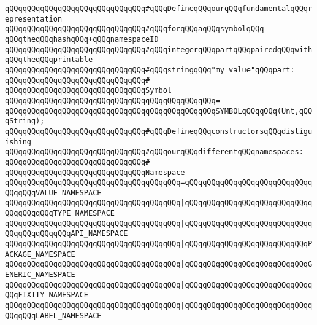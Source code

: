 \newline
\newline
\verb|qQQqqQQqqQQqqQQqqQQqqQQqqQQqqQQq#qQQqDefineqQQqourqQQqfundamentalqQQqrepresentation|\newline
\verb|qQQqqQQqqQQqqQQqqQQqqQQqqQQqqQQq#qQQqforqQQqaqQQqsymbolqQQq--qQQqtheqQQqhashqQQq+qQQqnamespaceID|\newline
\verb|qQQqqQQqqQQqqQQqqQQqqQQqqQQqqQQq#qQQqintegerqQQqpartqQQqpairedqQQqwithqQQqtheqQQqprintable|\newline
\verb|qQQqqQQqqQQqqQQqqQQqqQQqqQQqqQQq#qQQqstringqQQq"my_value"qQQqpart:|\newline
\verb|qQQqqQQqqQQqqQQqqQQqqQQqqQQqqQQq#|\newline
\verb|qQQqqQQqqQQqqQQqqQQqqQQqqQQqqQQqSymbol|\newline
\verb|qQQqqQQqqQQqqQQqqQQqqQQqqQQqqQQqqQQqqQQqqQQqqQQq=|\newline
\verb|qQQqqQQqqQQqqQQqqQQqqQQqqQQqqQQqqQQqqQQqqQQqqQQqSYMBOLqQQqqQQq(Unt,qQQqString);|\newline
\newline
\newline
\newline
\verb|qQQqqQQqqQQqqQQqqQQqqQQqqQQqqQQq#qQQqDefineqQQqconstructorsqQQqdistiguishing|\newline
\verb|qQQqqQQqqQQqqQQqqQQqqQQqqQQqqQQq#qQQqourqQQqdifferentqQQqnamespaces:|\newline
\verb|qQQqqQQqqQQqqQQqqQQqqQQqqQQqqQQq#|\newline
\verb|qQQqqQQqqQQqqQQqqQQqqQQqqQQqqQQqNamespace|\newline
\verb|qQQqqQQqqQQqqQQqqQQqqQQqqQQqqQQqqQQqqQQq=qQQqqQQqqQQqqQQqqQQqqQQqqQQqqQQqqQQqVALUE_NAMESPACE|\newline
\verb|qQQqqQQqqQQqqQQqqQQqqQQqqQQqqQQqqQQqqQQq|\verb#|qQQqqQQqqQQqqQQqqQQqqQQqqQQqqQQqqQQqqQQqTYPE_NAMESPACE#\newline
\verb|qQQqqQQqqQQqqQQqqQQqqQQqqQQqqQQqqQQqqQQq|\verb#|qQQqqQQqqQQqqQQqqQQqqQQqqQQqqQQqqQQqqQQqqQQqAPI_NAMESPACE#\newline
\verb|qQQqqQQqqQQqqQQqqQQqqQQqqQQqqQQqqQQqqQQq|\verb#|qQQqqQQqqQQqqQQqqQQqqQQqqQQqPACKAGE_NAMESPACE#\newline
\verb|qQQqqQQqqQQqqQQqqQQqqQQqqQQqqQQqqQQqqQQq|\verb#|qQQqqQQqqQQqqQQqqQQqqQQqqQQqGENERIC_NAMESPACE#\newline
\verb|qQQqqQQqqQQqqQQqqQQqqQQqqQQqqQQqqQQqqQQq|\verb#|qQQqqQQqqQQqqQQqqQQqqQQqqQQqqQQqFIXITY_NAMESPACE#\newline
\verb|qQQqqQQqqQQqqQQqqQQqqQQqqQQqqQQqqQQqqQQq|\verb#|qQQqqQQqqQQqqQQqqQQqqQQqqQQqqQQqqQQqLABEL_NAMESPACE#\newline
